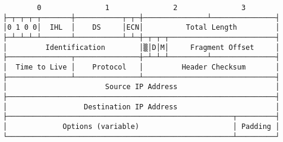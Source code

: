 \documentclass[varwidth=25cm,crop]{standalone}
\begin{document}
\begin{verbatim}
        0               1               2               3
├─┬─┬─┬─┬───────┼───────────┬─┬─┼───────────────┴───────────────┤
│0 1 0 0│  IHL  │    DS     │ECN│          Total Length         │
├─┴─┴─┴─┴───────┴───────────┴─┴─┼─┬─┬─┬─────────────────────────┤
│         Identification        │▒│D│M│     Fragment Offset     │
├───────────────┬───────────────┼─┴─┴─┴─────────┴───────────────┤
│  Time to Live │    Protocol   │         Header Checksum       │
├───────────────┴───────────────┴───────────────────────────────┤
│                       Source IP Address                       │
├───────────────────────────────────────────────────────────────┤
│                  Destination IP Address                       │
├─────────────────────────────────────────────────────┬─────────┤
│             Options (variable)                      │ Padding │
└─────────────────────────────────────────────────────┴─────────┘
\end{verbatim}
\end{document}
